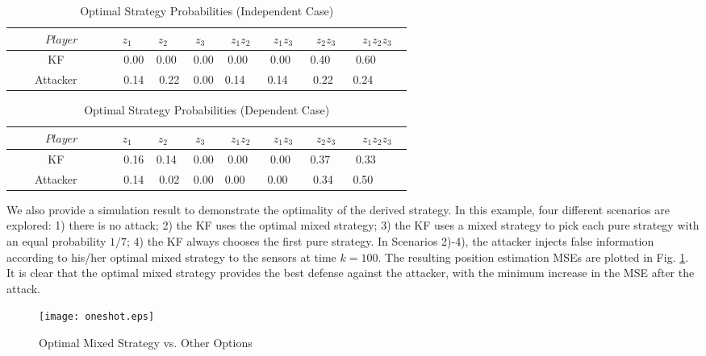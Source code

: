 \documentclass{article}
\begin{document}
  \begin{table}
	
 \caption{Optimal Strategy Probabilities (Independent Case)}
\vspace{0.1in}
{\footnotesize
  	\begin{tabular}{|c|c|c|c|c|c|c|c|}
		  	\hline
  	   $Player$       & $z_1$   &$ z_2$   & $z_3$  & $z_1z_2$ & $z_1z_3$ & $z_2z_3$ & $z_1z_2z_3$ \\ \hline
  	    KF       & 0.00 & 0.00  & 0.00 & 0.00  & 0.00  & 0.40   & 0.60     \\ 
  	    Attacker       & 0.14 & 0.22 & 0.00 & 0.14   & 0.14   & 0.22  & 0.24      \\ 
   \hline
  	\end{tabular}
  	}
  \label{table:independent_strategy}
  \end{table}
 \begin{table}
\small
\caption{Optimal Strategy Probabilities  (Dependent Case)}
\vspace{0.1in}
{\footnotesize
 	\begin{tabular}{|c|c|c|c|c|c|c|c|}
\hline
 	   $Player$       & $z_1$   &$ z_2$   & $z_3$  & $z_1z_2$ & $z_1z_3$ & $z_2z_3$ & $z_1z_2z_3$ \\ \hline
 	    KF       & 0.16 & 0.14  & 0.00 & 0.00  & 0.00  & 0.37   & 0.33     \\ 
 	    Attacker       & 0.14 & 0.02 & 0.00 & 0.00   & 0.00   & 0.34  & 0.50      \\ 
  \hline
 	\end{tabular}
 	}
 \label{table:dependent_strategy}
 \end{table}

We also provide a simulation result to demonstrate the optimality of the derived strategy. In this example, four different scenarios are explored: 1) there is no attack; 2) the KF uses the optimal mixed strategy; 3) the KF uses a mixed strategy to pick each pure strategy with an equal probability $1/7$; 4) the KF always chooses the first pure strategy. In Scenarios 2)-4), the attacker injects false information according to his/her optimal mixed strategy to the sensors at time $k=100$.   The resulting position estimation MSEs are  plotted in Fig. \ref{fig:strategy}. It is clear that the optimal mixed strategy provides the best defense against the attacker, with the minimum increase in the MSE after the attack. 

\begin{figure}[htb]
 \centering
 {\texttt{[image: oneshot.eps]}}
 \caption{Optimal Mixed Strategy vs. Other Options}
 \label{fig:strategy}
 \end{figure}
\end{document}
